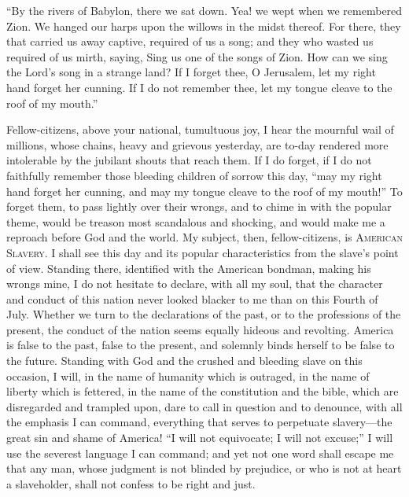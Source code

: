 ``By the rivers of Babylon, there we sat down. Yea! we wept when we
remembered Zion. We hanged our harps upon the willows in the midst
thereof. For there, they that carried us away captive, required of us a
song; and they who wasted us required of us mirth, saying, Sing us one
of the songs of Zion. How can we sing the Lord's song in a strange land?
If I forget thee, O Jerusalem, let my right hand forget her cunning. If
I do not remember thee, let my tongue cleave to the roof of my mouth.''

Fellow-citizens, above your national, tumultuous joy, I hear the
mournful wail of millions, whose chains, heavy and grievous yesterday,
are to-day rendered more intolerable by the jubilant shouts that reach
them. If I do forget, if I do not faithfully remember those bleeding
children of sorrow this day, ``may my right hand forget her cunning, and
may my tongue cleave to the roof of my mouth!'' To forget them, to pass
lightly over their wrongs, and to chime in with the popular theme, would
be treason most scandalous and shocking, and would make me a reproach
before God and the world. My subject, then, fellow-citizens, is
\textsc{American Slavery}. I shall see this day and its popular
characteristics from the slave's point of view. Standing there,
identified with the American bondman, making his wrongs mine, I do not
hesitate to declare, with all my soul, that the character and conduct of
this nation never looked blacker to me than on this Fourth of July.
Whether we turn to the declarations of the past, or to the professions
of the present, the conduct of the nation seems equally hideous and
revolting. America is false to the past, false to the present, and
solemnly binds herself to be false to the future. Standing with God and
the crushed and bleeding slave on this occasion, I will, in the name of
humanity which is outraged, in the name of liberty which is fettered, in
the name of the constitution and the bible, which are disregarded and
trampled upon, dare to call in question and to denounce, with all the
emphasis I can command, everything that serves to perpetuate
slavery---the great sin and shame of America! ``I will not equivocate; I
will not excuse;'' I will use the severest language I can {}command; and
yet not one word shall escape me that any man, whose judgment is not
blinded by prejudice, or who is not at heart a slaveholder, shall not
confess to be right and just.

